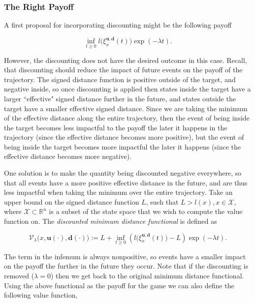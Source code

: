 \documentclass{journal}
\newcommand{\X}{\mathcal{X}}
\newcommand{\RR}{\mathbb{R}}
\newcommand{\bu}{\bm{u}}
\newcommand{\bdelta}{\bm{d}}
\newcommand{\bx}{\xi}
\begin{document}
\subsubsection{The Right Payoff}

A first proposal for incorporating discounting might be the following payoff

\begin{equation}\label{eq:V}
\inf_{t\ge 0}l\big(\bx_{x}^{\bu,\bdelta}(t)\big)\exp(-\lambda  t).
\end{equation}

However, the discounting does not have the desired outcome in this case. Recall, that discounting should reduce the impact of future events on the payoff of the trajectory. The signed distance function is positive outside of the target, and negative inside, so once discounting is applied then states inside the target have a larger ``effective" signed distance further in the future, and states outside the target have a smaller effective signed distance. Since we are taking the minimum of the effective distance along the entire trajectory, then the event of being inside the target becomes less impactful to the payoff the later it happens in the trajectory (since the effective distance becomes more positive), but the event of being inside the target becomes more impactful the later it happens (since the effective distance becomes more negative).

One solution is to make the quantity being discounted negative everywhere, so that all events have a more positive effective distance in the future, and are thus less impactful when taking the minimum over the entire trajectory. Take an upper bound on the signed distance function $L$, such that $L>l(x), x \in \X $, where $\X \subset \RR^n$ is a subset of the state space that we wish to compute the value function on. The \emph{discounted minimum distance functional} is defined as 

\begin{equation}\label{eq:V_lambda}
\mathcal{V}_{\lambda}\big(x,\bu(\cdot),\bdelta(\cdot)\big) := L + \inf_{t\ge 0}(l\big(\bx_{x}^{\bu,\bdelta}(t)\big)-L)\exp(-\lambda  t).
\end{equation}

The term in the infemum is always nonpositive, so events have a smaller impact on the payoff the further in the future they occur. Note that if the discounting is removed ($\lambda =0$) then we get back to the original minimum distance functional. Using the above functional as the payoff for the game we can also define the following value function,
\end{document}
